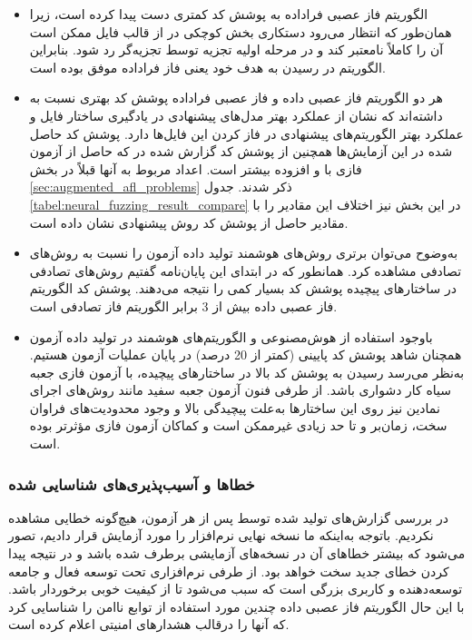 \begin{itemize}
	\item{
الگوریتم فاز عصبی فراداده به پوشش کد کمتری دست پیدا کرده است، زیرا همان‌طور که انتظار می‌رود دستکاری بخش کوچکی در از قالب فایل ممکن است آن را کاملاً نامعتبر کند و در مرحله اولیه تجزیه توسط تجزیه‌گر رد شود. بنابراین الگوریتم در رسیدن به هدف خود یعنی فاز فراداده موفق بوده است.  	
}
\item{
هر دو الگوریتم فاز عصبی داده و فاز عصبی فراداده پوشش کد بهتری نسبت به
داشته‌اند که نشان از عملکرد بهتر مد‌ل‌های پیشنهادی در یادگیری ساختار فایل و عملکرد بهتر الگوریتم‌های پیشنهادی در فاز کردن این فایل‌ها دارد. پوشش کد حاصل شده در این آزمایش‌ها همچنین از پوشش کد گزارش شده در 
\cite{DBLP:journals/corr/abs-1711-04596}
که حاصل از آزمون فازی  با   و  افزوده بیشتر است. اعداد مربوط به آنها قبلاً در بخش \ref{sec:augmented_afl_problems} ذکر شدند. جدول \ref{tabel:neural_fuzzing_result_compare} در این بخش نیز اختلاف این مقادیر را با مقادیر حاصل از پوشش کد روش پیشنهادی نشان داده است.
	 
}
\item{
به‌وضوح می‌توان برتری روش‌های هوشمند تولید داده آزمون را نسبت به روش‌های تصادفی مشاهده کرد. همانطور که در ابتدای این پایان‌نامه گفتیم روش‌های تصادفی در ساختارهای پیچیده پوشش کد بسیار کمی را نتیجه می‌دهند. پوشش کد الگوریتم فاز عصبی داده بیش از 3 برابر الگوریتم فاز تصادفی است.
}

\item{
باوجود استفاده از هوش‌مصنوعی و الگوریتم‌های هوشمند در تولید داده آزمون همچنان شاهد پوشش کد پایینی (کمتر از 20 درصد) در پایان عملیات آزمون هستیم. به‌نظر می‌رسد رسیدن به پوشش کد بالا در ساختارهای پیچیده، با آزمون فازی جعبه سیاه کار دشواری باشد. از طرفی فنون آزمون جعبه سفید مانند روش‌های اجرای نمادین نیز روی این ساختارها به‌علت پیچیدگی بالا و وجود محدودیت‌های فراوان سخت، زمان‌بر و تا حد زیادی غیرممکن است و کماکان آزمون فازی مؤثرتر بوده است.   
}
\end{itemize}



\subsubsection{خطا‌ها و آسیب‌پذیری‌های شناسایی شده}
در بررسی گزارش‌های تولید شده توسط  پس از هر آزمون، هیچ‌گونه خطایی مشاهده نکردیم. باتوجه به‌اینکه ما نسخه نهایی نرم‌افزار  را مورد آزمایش قرار دادیم، تصور می‌شود که بیشتر خطا‌های آن در نسخه‌های آزمایشی برطرف شده باشد و در نتیجه پیدا کردن خطای جدید سخت خواهد بود. از طرفی  نرم‌افزاری تحت توسعه فعال و جامعه توسعه‌دهنده و کاربری بزرگی است که سبب می‌شود تا از کیفیت خوبی برخوردار باشد. با این حال الگوریتم فاز عصبی داده چندین مورد استفاده از توابع ناامن را شناسایی کرد که  آنها را درقالب هشدارهای امنیتی اعلام کرده است. 

